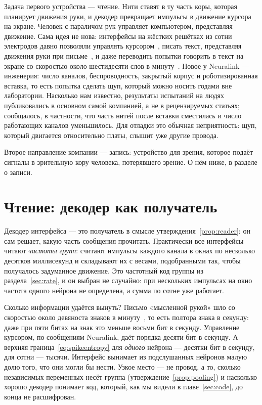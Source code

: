 Задача первого устройства --- чтение. Нити ставят в ту часть коры, которая планирует движения руки, и декодер превращает импульсы в движение курсора на экране. Человек с параличом рук управляет компьютером, представляя движение. Сама идея не нова: интерфейсы на жёстких решётках из сотни электродов давно позволяли управлять курсором~\cite{Hochberg2006}, писать текст, представляя движения руки при письме~\cite{Willett2021}, и даже переводить попытки говорить в текст на экране со скоростью около шестидесяти слов в минуту~\cite{Willett2023}. Новое у Neuralink --- инженерия: число каналов, беспроводность, закрытый корпус и роботизированная вставка, то есть попытка сделать щуп, который можно носить годами вне лаборатории. Насколько нам известно, результаты испытаний на людях публиковались в основном самой компанией, а не в рецензируемых статьях; сообщалось, в частности, что часть нитей после вставки сместилась и число работающих каналов уменьшилось. Для отладки это обычная неприятность: щуп, который двигается относительно платы, слышит уже другие провода.

Второе направление компании --- запись: устройство для зрения, которое подаёт сигналы в зрительную кору человека, потерявшего зрение. О нём ниже, в разделе о записи.

\section{Чтение: декодер как получатель}

Декодер интерфейса --- это получатель в смысле утверждения~\ref{prop:reader}: он сам решает, какую часть сообщения прочитать. Практически все интерфейсы читают \emph{частоты групп}: считают импульсы каждого канала в окнах по несколько десятков миллисекунд и складывают их с весами, подобранными так, чтобы получалось задуманное движение. Это частотный код группы из раздела~\ref{sec:rate}, и он выбран не случайно: при нескольких импульсах на окно частота одного нейрона не определена, а сумма по сотне уже работает.

Сколько информации удаётся вынуть? Письмо «мысленной рукой» шло со скоростью около девяноста знаков в минуту~\cite{Willett2021}, то есть полтора знака в секунду: даже при пяти битах на знак это меньше восьми бит в секунду. Управление курсором, по сообщениям Neuralink, даёт порядка десяти бит в секунду. А верхняя граница~\eqref{eq:spikeentropy} для \emph{одного} нейрона --- десятки бит в секунду, для сотни --- тысячи. Интерфейс вынимает из подслушанных нейронов малую долю того, что они могли бы нести. Узкое место --- не провод, а то, сколько независимых переменных несёт группа (утверждение~\ref{prop:pooling}) и насколько хорошо декодер понимает код, который, как мы видели в главе~\ref{sec:code}, до конца не расшифрован.

